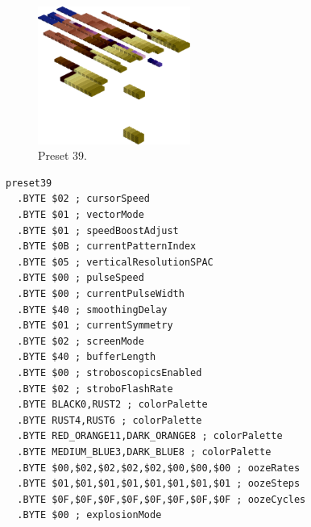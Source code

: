 \clearpage
\begin{minipage}[b]{0.48\linewidth}
\begin{figure}[H]                                                          
  \centering                                                             
  \begin{adjustbox}{width=5cm,center}                                   
  \includegraphics[width=5cm]{src/colorspace_presets/preset39-45.png}%
  \end{adjustbox}                                                        
\caption*{Preset 39.}                                           
\end{figure}                                                               
\end{minipage}
\hspace{0.1cm}
\begin{minipage}[b]{0.48\linewidth}                            
\begin{lstlisting}[basicstyle=\ttfamily\tiny]
preset39
  .BYTE $02 ; cursorSpeed
  .BYTE $01 ; vectorMode
  .BYTE $01 ; speedBoostAdjust
  .BYTE $0B ; currentPatternIndex
  .BYTE $05 ; verticalResolutionSPAC
  .BYTE $00 ; pulseSpeed
  .BYTE $00 ; currentPulseWidth
  .BYTE $40 ; smoothingDelay
  .BYTE $01 ; currentSymmetry
  .BYTE $02 ; screenMode
  .BYTE $40 ; bufferLength
  .BYTE $00 ; stroboscopicsEnabled
  .BYTE $02 ; stroboFlashRate
  .BYTE BLACK0,RUST2 ; colorPalette
  .BYTE RUST4,RUST6 ; colorPalette
  .BYTE RED_ORANGE11,DARK_ORANGE8 ; colorPalette
  .BYTE MEDIUM_BLUE3,DARK_BLUE8 ; colorPalette
  .BYTE $00,$02,$02,$02,$02,$00,$00,$00 ; oozeRates
  .BYTE $01,$01,$01,$01,$01,$01,$01,$01 ; oozeSteps
  .BYTE $0F,$0F,$0F,$0F,$0F,$0F,$0F,$0F ; oozeCycles
  .BYTE $00 ; explosionMode
\end{lstlisting}
\end{minipage}

\vspace*{-0.5cm}

